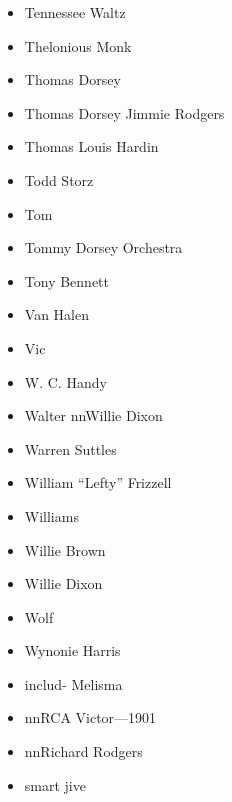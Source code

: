 \documentclass[12pt,a4paper]{article}
\begin{document}
\begin{itemize}
  \item Tennessee Waltz
  \item Thelonious Monk
  \item Thomas Dorsey
  \item Thomas Dorsey Jimmie Rodgers
  \item Thomas Louis Hardin
  \item Todd Storz
  \item Tom
  \item Tommy Dorsey Orchestra
  \item Tony Bennett
  \item Van Halen
  \item Vic
  \item W. C. Handy
  \item Walter nnWillie Dixon
  \item Warren Suttles
  \item William ``Lefty'' Frizzell
  \item Williams
  \item Willie Brown
  \item Willie Dixon
  \item Wolf
  \item Wynonie Harris
  \item includ- Melisma
  \item nnRCA Victor---1901
  \item nnRichard Rodgers
  \item smart jive
\end{itemize}
\end{document}
